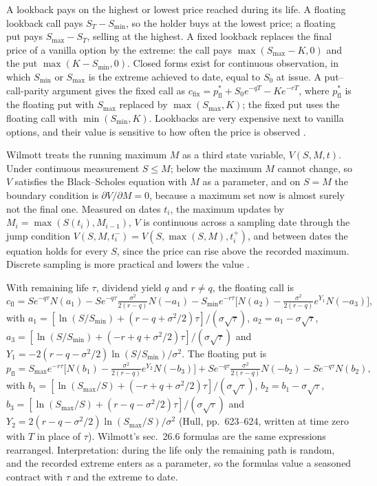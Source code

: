 \begin{qfmethod}\label{meth:lookback-option-valuation}
 A lookback pays on the highest or lowest price reached during its life. A floating lookback call pays $S_T-S_{\min}$, so the holder buys at the lowest price; a floating put pays $S_{\max}-S_T$, selling at the highest. A fixed lookback replaces the final price of a vanilla option by the extreme: the call pays $\max(S_{\max}-K,0)$ and the put $\max(K-S_{\min},0)$. Closed forms exist for continuous observation, in which $S_{\min}$ or $S_{\max}$ is the extreme achieved to date, equal to $S_0$ at issue. A put--call-parity argument gives the fixed call as $c_{\text{fix}}=p^*_{\text{fl}}+S_0e^{-qT}-Ke^{-rT}$, where $p^*_{\text{fl}}$ is the floating put with $S_{\max}$ replaced by $\max(S_{\max},K)$; the fixed put uses the floating call with $\min(S_{\min},K)$. Lookbacks are very expensive next to vanilla options, and their value is sensitive to how often the price is observed \citep[chap.~26, sec.~26.11, pp.~623--625]{s7-hulloptions}.

Wilmott treats the running maximum $M$ as a third state variable, $V(S,M,t)$. Under continuous measurement $S\le M$; below the maximum $M$ cannot change, so $V$ satisfies the Black--Scholes equation with $M$ as a parameter, and on $S=M$ the boundary condition is $\partial V/\partial M=0$, because a maximum set now is almost surely not the final one. Measured on dates $t_i$, the maximum updates by $M_i=\max(S(t_i),M_{i-1})$, $V$ is continuous across a sampling date through the jump condition $V(S,M,t_i^-)=V(S,\max(S,M),t_i^+)$, and between dates the equation holds for every $S$, since the price can rise above the recorded maximum. Discrete sampling is more practical and lowers the value \citep[chap.~24, secs.~24.4--24.5, pp.~422--425; chap.~26, secs.~26.2--26.6, pp.~445--452]{wide-wilmott-pwoqf}.

 With remaining life $\tau$, dividend yield $q$ and $r\ne q$, the floating call is
\[ c_{\text{fl}}=Se^{-q\tau}N(a_1)-Se^{-q\tau}\tfrac{\sigma^2}{2(r-q)}N(-a_1)-S_{\min}e^{-r\tau}\bigl[N(a_2)-\tfrac{\sigma^2}{2(r-q)}e^{Y_1}N(-a_3)\bigr], \]
with $a_1=[\ln(S/S_{\min})+(r-q+\sigma^2/2)\tau]/(\sigma\sqrt\tau)$, $a_2=a_1-\sigma\sqrt\tau$, $a_3=[\ln(S/S_{\min})+(-r+q+\sigma^2/2)\tau]/(\sigma\sqrt\tau)$ and $Y_1=-2(r-q-\sigma^2/2)\ln(S/S_{\min})/\sigma^2$. The floating put is
\[ p_{\text{fl}}=S_{\max}e^{-r\tau}\bigl[N(b_1)-\tfrac{\sigma^2}{2(r-q)}e^{Y_2}N(-b_3)\bigr]+Se^{-q\tau}\tfrac{\sigma^2}{2(r-q)}N(-b_2)-Se^{-q\tau}N(b_2), \]
with $b_1=[\ln(S_{\max}/S)+(-r+q+\sigma^2/2)\tau]/(\sigma\sqrt\tau)$, $b_2=b_1-\sigma\sqrt\tau$, $b_3=[\ln(S_{\max}/S)+(r-q-\sigma^2/2)\tau]/(\sigma\sqrt\tau)$ and $Y_2=2(r-q-\sigma^2/2)\ln(S_{\max}/S)/\sigma^2$ (Hull, pp.~623--624, written at time zero with $T$ in place of $\tau$). Wilmott's sec.~26.6 formulas are the same expressions rearranged. Interpretation: during the life only the remaining path is random, and the recorded extreme enters as a parameter, so the formulas value a seasoned contract with $\tau$ and the extreme to date.


\end{qfmethod}
